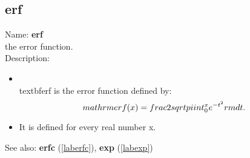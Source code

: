 \subsection{erf}
\label{laberf}
\noindent Name: \textbf{erf}\\
the error function.\\
\noindent Description: \begin{itemize}

\item \\textbf{erf} is the error function defined by:\n   $$\\mathrm{erf}(x) = \\frac{2}{\\sqrt{\\pi}} \\int_0^x e^{-t^2} {\\rm d}t.$$\n
\item It is defined for every real number x.\n\end{itemize}
See also: \textbf{erfc} (\ref{laberfc}), \textbf{exp} (\ref{labexp})
